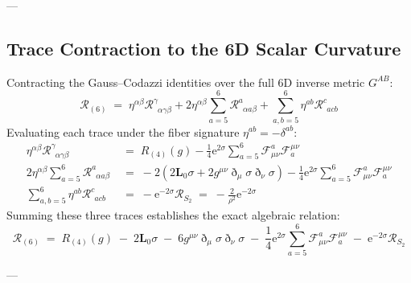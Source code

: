 \documentclass[
    12pt,
    a4paper,
    headings=normal,
    twoside=false,
    open=any,
    parskip=half
]{scrbook}
\newcommand{\ethop}{\eth}
\newcommand{\eu}{\mathrm{e}}
\begin{document}
---

\subsection{Trace Contraction to the 6D Scalar Curvature}

Contracting the Gauss--Codazzi identities over the full 6D inverse metric $G^{AB}$:
\begin{equation}
\mathcal{R}_{(6)} \;=\; \eta^{\alpha\beta} \mathcal{R}^\gamma_{\phantom{\gamma}\alpha\gamma\beta} + 2 \eta^{\alpha\beta} \sum_{a=5}^6 \mathcal{R}^a_{\phantom{a}\alpha a\beta} + \sum_{a,b=5}^6 \eta^{ab} \mathcal{R}^c_{\phantom{c}acb}
\end{equation}
Evaluating each trace under the fiber signature $\eta^{ab} = -\delta^{ab}$:
\begin{align*}
\eta^{\alpha\beta} \mathcal{R}^\gamma_{\phantom{\gamma}\alpha\gamma\beta} &\;=\; R_{(4)}(g) - \frac{1}{4} \eu^{2\sigma} \sum_{a=5}^6 \mathcal{F}_{\mu\nu}^a \mathcal{F}^{\mu\nu}_a \\
2 \eta^{\alpha\beta} \sum_{a=5}^6 \mathcal{R}^a_{\phantom{a}\alpha a\beta} &\;=\; -2 \left( 2 \mathbf{L}_0 \sigma + 2 g^{\mu\nu}\ethop_\mu\sigma \ethop_\nu\sigma \right) - \frac{1}{4} \eu^{2\sigma} \sum_{a=5}^6 \mathcal{F}_{\mu\nu}^a \mathcal{F}^{\mu\nu}_a \\
\sum_{a,b=5}^6 \eta^{ab} \mathcal{R}^c_{\phantom{c}acb} &\;=\; -\eu^{-2\sigma} \mathcal{R}_{S_2} \;=\; -\frac{2}{\rho^2} \eu^{-2\sigma}
\end{align*}
Summing these three traces establishes the exact algebraic relation:
\begin{equation}
\boxed{\mathcal{R}_{(6)} \;=\; R_{(4)}(g) \;-\; 2 \mathbf{L}_0 \sigma \;-\; 6 g^{\mu\nu}\ethop_\mu\sigma \ethop_\nu\sigma \;-\; \frac{1}{4}\eu^{2\sigma}\sum_{a=5}^6 \mathcal{F}_{\mu\nu}^a \mathcal{F}^{\mu\nu}_a \;-\; \eu^{-2\sigma}\mathcal{R}_{S_2}}
\label{eq:ch2_exact_6d_ricci_scalar}
\end{equation}

---
\end{document}
